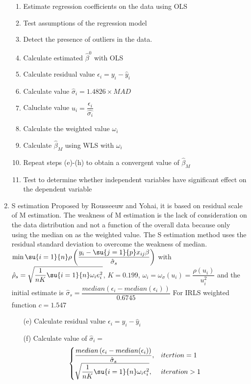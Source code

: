 \begin{enumerate}
		\begin{enumerate}
			\item Estimate regression coefficients on the data using OLS
			\item Test assumptions of the regression model
			\item Detect the presence of outliers in the data.
			\item Calculate estimated $\hat{\beta}^{0}$ with OLS
			\item Calculate residual value $\epsilon_{i}=y_{i}-\hat{y}_{i}$
			\item Calculate value $\hat{\sigma}_{i}=1.4826\times MAD$
			\item Caluclate value $u_{i}=\dfrac{\epsilon_{i}}{\hat{\sigma_{i}}}$
			\item Calculate the weighted value $\omega_{i}$ 
			\item Calculate $\hat{\beta}_{M}$ using WLS with $\omega_{i}$
			\item Repeat steps (e)-(h) to obtain a convergent value of $\hat{\beta}_{M}$
			\item Test to determine whether independent variables have significant effect
				on the dependent variable
		\end{enumerate}
	\item S estimation
		Proposed by Rousseeuw and Yohai, it is based on residual scale of M estimation. The
		weakness of M estimation is the lack of consideration on the data distribution and
		not a function of the overall data because only using the median on as the weighted
		value. The S estimation method uses the residual standard deviation to overcome the 
		weakness of median.\\
		$\min\su{{i=1}}{n}\rho\left(\dfrac{y_{i}-\su{{j=1}}{p}x_{ij}\beta}{\hat{\sigma}_{s}}
		\right)$ with $\hat{\rho}_{s}=\sqrt{\dfrac{1}{nK}\su{{i=1}}{n}\omega_{i}e_{i}^{2}}$,
		$K=0.199$, $\omega_{i}=\omega_{\sigma}(u_{i})=\dfrac{\rho(u_{i})}{u_{i}^{2}}$
		and the initial estimate is $\hat{\sigma}_{s}=\dfrac{median\left(\epsilon_{i}-
		median(\epsilon_{i})\right)}{0.6745}$
		For IRLS weighted function $c= 1.547$
		\begin{enumerate}
			\item[(e)] Calculate residual value $\epsilon_{i}=y_{i}-\hat{y}_{i}$ 
			\item[(f)] Calculate value of $\hat{\sigma}_{i}=$
				\begin{align*}
				\begin{cases}
					\dfrac{median\left(\epsilon_{i}-median(\epsilon_{i})\right)}{
					\hat{\sigma}_{s}},& itertion=1\\
					\sqrt{\dfrac{1}{nK}\su{{i=1}}{n}\omega_{i}\epsilon_{i}^{2}},&
					iteration>1
				\end{cases}
				\end{align*}


\end{enumerate}
\end{enumerate}
